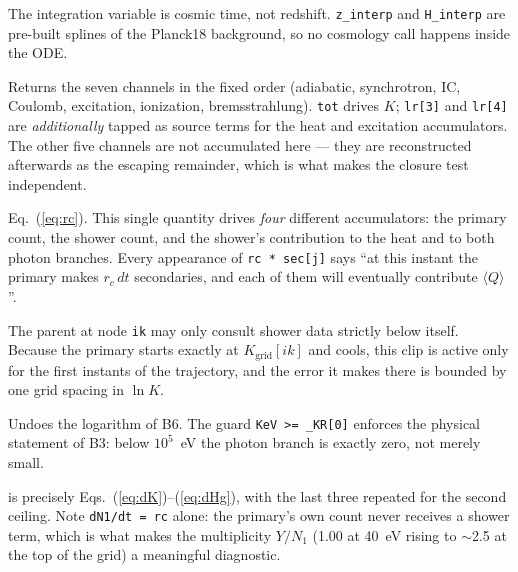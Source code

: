 \documentclass[11pt,a4paper]{article}
\newcommand{\code}[1]{\texttt{\small #1}}
\begin{document}
\begin{description}[leftmargin=0pt,style=unboxed,itemsep=3pt]
\item[\code{z = L.z\_interp(t)}] The integration variable is cosmic time, not
      redshift.  \code{z\_interp} and \code{H\_interp} are pre-built splines of
      the Planck18 background, so no cosmology call happens inside the ODE.
\item[\code{lr = L.loss\_rates(...)}] Returns the seven channels in the fixed
      order (adiabatic, synchrotron, IC, Coulomb, excitation, ionization,
      bremsstrahlung).  \code{tot} drives $K$; \code{lr[3]} and \code{lr[4]}
      are \emph{additionally} tapped as source terms for the heat and
      excitation accumulators.  The other five channels are not accumulated
      here --- they are reconstructed afterwards as the escaping remainder,
      which is what makes the closure test independent.
\item[\code{rc = n\_HI * v * sigma\_ion}] Eq.~(\ref{eq:rc}).  This single
      quantity drives \emph{four} different accumulators: the primary count,
      the shower count, and the shower's contribution to the heat and to both
      photon branches.  Every appearance of \code{rc * sec[j]} says ``at this
      instant the primary makes $r_c\,dt$ secondaries, and each of them will
      eventually contribute $\langle Q\rangle$''.
\item[the \code{clip} to \code{K\_GRID[ik-1]}] The parent at node \code{ik}
      may only consult shower data strictly below itself.  Because the primary
      starts exactly at $K_{\mathrm{grid}}[ik]$ and cools, this clip is active
      only for the first instants of the trajectory, and the error it makes
      there is bounded by one grid spacing in $\ln K$.
\item[\code{ph = np.exp(rates(...))}] Undoes the logarithm of B6.  The guard
      \code{KeV >= \_KR[0]} enforces the physical statement of B3: below
      $10^5$~eV the photon branch is exactly zero, not merely small.
\item[the return list] is precisely
      Eqs.~(\ref{eq:dK})--(\ref{eq:dHg}), with the last three repeated for the
      second ceiling.  Note \code{dN1/dt = rc} alone: the primary's own count
      never receives a shower term, which is what makes the multiplicity
      $Y/N_1$ (1.00 at 40~eV rising to $\sim$2.5 at the top of the grid) a
      meaningful diagnostic.
\end{description}

\end{document}
